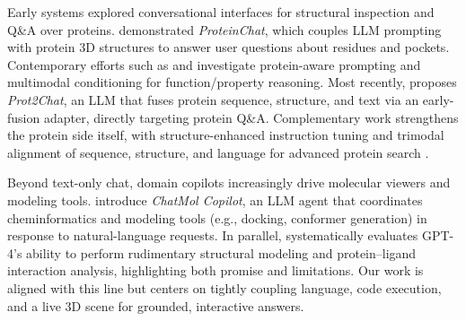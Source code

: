 \documentclass[journal=jcisd8,manuscript=article]{achemso}
\begin{document}
Early systems explored conversational interfaces for structural inspection and Q\&A over proteins. \citet{guo2023proteinchat} demonstrated \emph{ProteinChat}, which couples LLM prompting with protein 3D structures to answer user questions about residues and pockets. Contemporary efforts such as \citet{wang2024protchatgpt} and \citet{xiao2024proteingpt} investigate protein-aware prompting and multimodal conditioning for function/property reasoning. Most recently, \citet{wang2025prot2chat} proposes \emph{Prot2Chat}, an LLM that fuses protein sequence, structure, and text via an early-fusion adapter, directly targeting protein Q\&A. Complementary work strengthens the protein side itself, with structure-enhanced instruction tuning \citep{wu2025sepit} and trimodal alignment of sequence, structure, and language for advanced protein search \citep{su2025protrek}.

Beyond text-only chat, domain copilots increasingly drive molecular viewers and modeling tools. \citet{sun2024chatmol} introduce \emph{ChatMol Copilot}, an LLM agent that coordinates cheminformatics and modeling tools (e.g., docking, conformer generation) in response to natural-language requests. In parallel, \citet{ille2024gpt4structural} systematically evaluates GPT-4's ability to perform rudimentary structural modeling and protein–ligand interaction analysis, highlighting both promise and limitations. Our work is aligned with this line but centers on tightly coupling language, code execution, and a live 3D scene for grounded, interactive answers.
\end{document}
